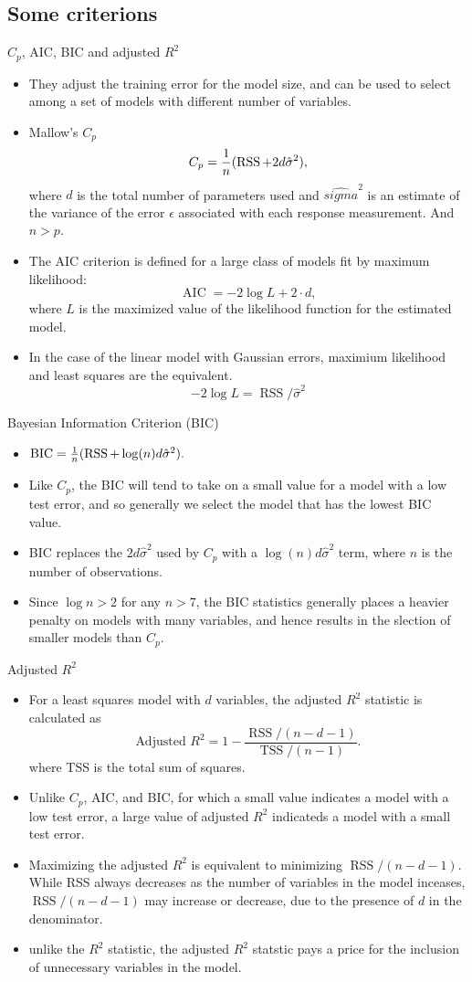 \documentclass[11pt, a4paper]{article}
\begin{document}
  \subsection{Some criterions}
$C_p$, AIC, BIC and adjusted $R^2$
\begin{itemize}
  \item They adjust the training error for the model size, and can be used to select among a set of models with different number of variables.
  \item Mallow's $C_p$
    \[
      C_p={1\over n}(\operatorname{RSS}+2d\hat{\sigma}^2),
    \]
    where $d$ is the total number of parameters used and $\hat{sigma}^2$ is an estimate of the variance of the error $\epsilon$ associated with each response measurement. And $n>p$.
\item The AIC criterion is defined for a large class of models fit by maximum likelihood:
\[
\operatorname{AIC} = -2\log L+2\cdot d,
\]
where $L$ is the maximized value of the likelihood function for the estimated model.
\item In the case of the linear model with Gaussian errors, maximium likelihood and least squares are the equivalent. 
  \[
    -2\log L =\operatorname{RSS}/\hat{\sigma}^2
  \]
  \end{itemize}
  Bayesian Information Criterion (BIC)
\begin{itemize}
  \item $\operatorname{BIC}={1\over n}(\operatorname{RSS}+\log(n)d\hat{\sigma}^2).$
  \item Like $C_p$, the BIC will tend to take on a small value for a model with a low test error, and so generally we select the model that has the lowest BIC value.
  \item BIC replaces the $2d\hat{\sigma}^2$ used by $C_p$ with a $\log(n)d\hat{\sigma}^2$ term, where $n$ is the number of observations.
  \item Since $\log n > 2$ for any $n>7$, the BIC statistics generally places a heavier penalty on models with many variables, and hence results in the slection of smaller models than $C_p$.
\end{itemize}
Adjusted $R^2$
\begin{itemize}
\item For a least squares model with $d$ variables, the adjusted $R^2$ statistic is calculated as 
    \[
      \text{Adjusted }R^2=1-\frac{\operatorname{RSS}/(n-d-1)}{\operatorname{TSS}/(n-1)}.
    \]
    where TSS is the total sum of squares.
\item Unlike $C_p$, AIC, and BIC, for which a small value indicates a model with a low test error, a large value of adjusted $R^2$ indicateds a model with a small test error.
\item Maximizing the adjusted $R^2$ is equivalent to minimizing $\operatorname{RSS}/(n-d-1).$ While RSS always decreases as the number of variables in the model inceases, $\operatorname{RSS}/(n-d-1)$ may increase or decrease, due to the presence of $d$ in the denominator.
\item unlike the $R^2$ statistic, the adjusted $R^2$ statstic pays a price for the inclusion of unnecessary variables in the model.
\end{itemize}
\end{document}
